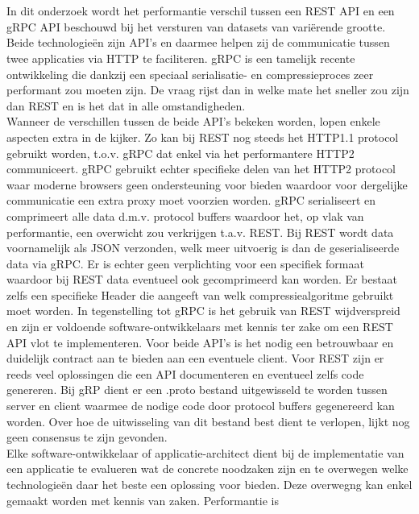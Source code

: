 \chapter*{}
In dit onderzoek wordt het performantie verschil tussen een REST API en een gRPC API beschouwd bij het versturen van datasets van vari\"erende grootte.
Beide technologie\"en zijn API's en daarmee helpen zij de communicatie tussen twee applicaties via HTTP te faciliteren. gRPC is een tamelijk recente ontwikkeling die
dankzij een speciaal serialisatie- en compressieproces zeer performant zou moeten zijn. De vraag rijst dan in welke mate het sneller zou zijn dan REST en is het dat
in alle omstandigheden.\\
Wanneer de verschillen tussen de beide API's bekeken worden, lopen enkele aspecten extra in de kijker.
Zo kan bij REST nog steeds het HTTP1.1 protocol gebruikt worden, t.o.v. gRPC dat enkel via het performantere HTTP2 communiceert.
gRPC gebruikt echter specifieke delen van het HTTP2 protocol waar moderne browsers geen ondersteuning voor bieden
waardoor voor dergelijke communicatie een extra proxy moet voorzien worden.
gRPC serialiseert en comprimeert alle data d.m.v. protocol buffers waardoor het, op vlak van performantie, een overwicht zou verkrijgen t.a.v. REST.
Bij REST wordt data voornamelijk als JSON verzonden, welk meer uitvoerig is dan de geserialiseerde data via gRPC.
Er is echter geen verplichting voor een specifiek formaat waardoor bij REST data eventueel ook gecomprimeerd kan worden.
Er bestaat zelfs een specifieke Header die aangeeft van welk compressiealgoritme gebruikt moet worden.
In tegenstelling tot gRPC is het gebruik van REST wijdverspreid en zijn er voldoende software-ontwikkelaars met kennis ter zake om een REST API vlot te implementeren.
Voor beide API's is het nodig een betrouwbaar en duidelijk contract aan te bieden aan een eventuele client.
Voor REST zijn er reeds veel oplossingen die een API documenteren en eventueel zelfs code genereren.
Bij gRP dient er een .proto bestand uitgewisseld te worden tussen server en client waarmee de nodige code door protocol buffers gegenereerd kan worden.
Over hoe de uitwisseling van dit bestand best dient te verlopen, lijkt nog geen consensus te zijn gevonden.\\
Elke software-ontwikkelaar of applicatie-architect dient bij de implementatie van een applicatie te evalueren wat de concrete noodzaken
zijn en te overwegen welke technologie\"en daar het beste een oplossing voor bieden. Deze overwegng kan enkel gemaakt worden met kennis van zaken. Performantie is
